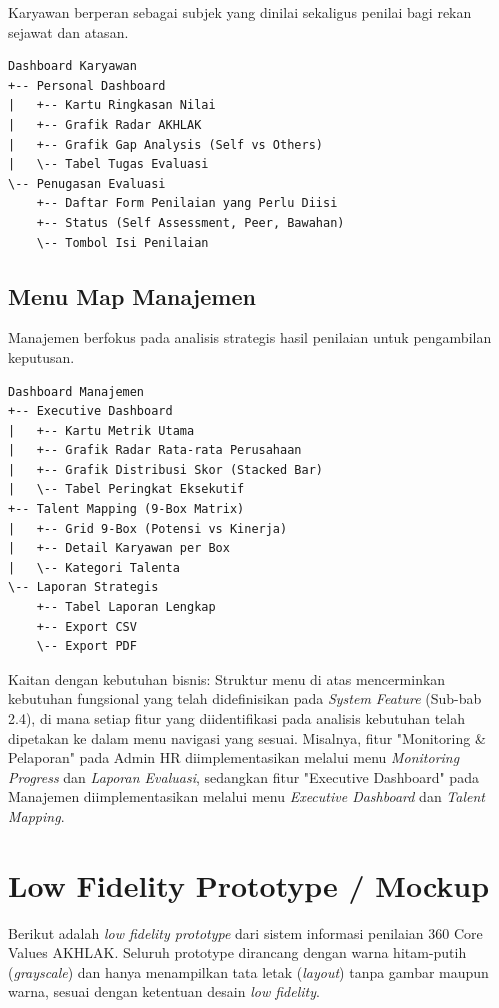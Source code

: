 \documentclass[12pt,a4paper,oneside]{report}
\begin{document}
Karyawan berperan sebagai subjek yang dinilai sekaligus penilai bagi rekan sejawat dan atasan.

\begin{verbatim}
Dashboard Karyawan
+-- Personal Dashboard
|   +-- Kartu Ringkasan Nilai
|   +-- Grafik Radar AKHLAK
|   +-- Grafik Gap Analysis (Self vs Others)
|   \-- Tabel Tugas Evaluasi
\-- Penugasan Evaluasi
    +-- Daftar Form Penilaian yang Perlu Diisi
    +-- Status (Self Assessment, Peer, Bawahan)
    \-- Tombol Isi Penilaian
\end{verbatim}

\subsection{Menu Map Manajemen}

Manajemen berfokus pada analisis strategis hasil penilaian untuk pengambilan keputusan.

\begin{verbatim}
Dashboard Manajemen
+-- Executive Dashboard
|   +-- Kartu Metrik Utama
|   +-- Grafik Radar Rata-rata Perusahaan
|   +-- Grafik Distribusi Skor (Stacked Bar)
|   \-- Tabel Peringkat Eksekutif
+-- Talent Mapping (9-Box Matrix)
|   +-- Grid 9-Box (Potensi vs Kinerja)
|   +-- Detail Karyawan per Box
|   \-- Kategori Talenta
\-- Laporan Strategis
    +-- Tabel Laporan Lengkap
    +-- Export CSV
    \-- Export PDF
\end{verbatim}

Kaitan dengan kebutuhan bisnis: Struktur menu di atas mencerminkan kebutuhan fungsional yang telah didefinisikan pada \textit{System Feature} (Sub-bab 2.4), di mana setiap fitur yang diidentifikasi pada analisis kebutuhan telah dipetakan ke dalam menu navigasi yang sesuai. Misalnya, fitur "Monitoring \& Pelaporan" pada Admin HR diimplementasikan melalui menu \textit{Monitoring Progress} dan \textit{Laporan Evaluasi}, sedangkan fitur "Executive Dashboard" pada Manajemen diimplementasikan melalui menu \textit{Executive Dashboard} dan \textit{Talent Mapping}.

\section{Low Fidelity Prototype / Mockup}

Berikut adalah \textit{low fidelity prototype} dari sistem informasi penilaian 360\textdegree{} Core Values AKHLAK. Seluruh prototype dirancang dengan warna hitam-putih (\textit{grayscale}) dan hanya menampilkan tata letak (\textit{layout}) tanpa gambar maupun warna, sesuai dengan ketentuan desain \textit{low fidelity}.
\end{document}
